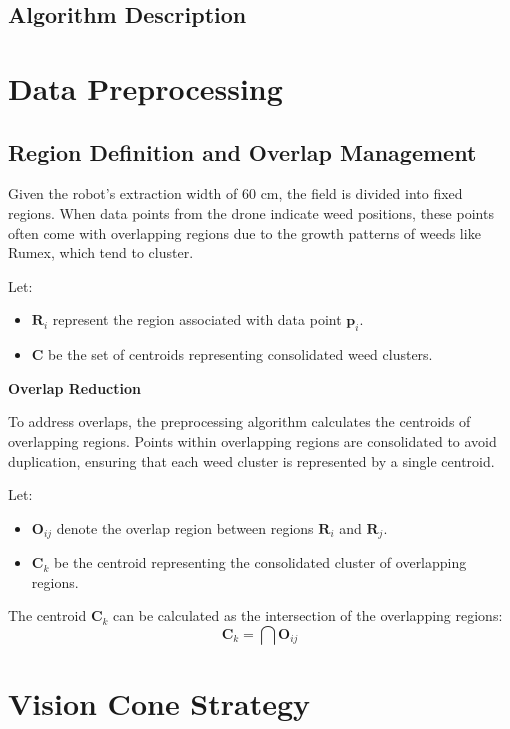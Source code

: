 
\subsection{Algorithm Description}




\section*{Data Preprocessing}


\subsection*{Region Definition and Overlap Management}

Given the robot’s extraction width of 60 cm, the field is divided into fixed regions. When data points from the drone indicate weed positions, these points often come with overlapping regions due to the growth patterns of weeds like Rumex, which tend to cluster.

Let:

\begin{itemize}
    \item $\mathbf{R}_i$ represent the region associated with data point $\mathbf{p}_i$.
    \item $\mathbf{C}$ be the set of centroids representing consolidated weed clusters.
\end{itemize}

\textbf{Overlap Reduction}

To address overlaps, the preprocessing algorithm calculates the centroids of overlapping regions. Points within overlapping regions are consolidated to avoid duplication, ensuring that each weed cluster is represented by a single centroid.

Let:

\begin{itemize}
    \item $\mathbf{O}_{ij}$ denote the overlap region between regions $\mathbf{R}_i$ and $\mathbf{R}_j$.
    \item $\mathbf{C}_k$ be the centroid representing the consolidated cluster of overlapping regions.
\end{itemize}

The centroid $\mathbf{C}_k$ can be calculated as the intersection of the overlapping regions:
\[
\mathbf{C}_k = \bigcap \mathbf{O}_{ij}
\]


\newpage

\section*{Vision Cone Strategy}

